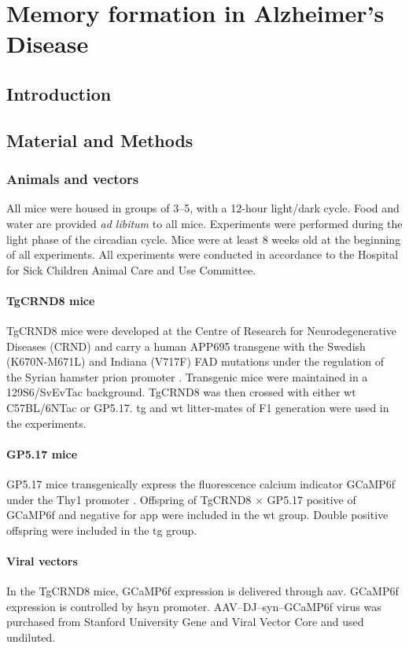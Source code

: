 \chapter{Memory formation in Alzheimer's Disease}
\section{Introduction}

\section{Material and Methods}

\subsection{Animals and vectors}
All mice were housed in groups of 3--5, with a 12-hour light/dark cycle. Food and water are provided \textit{ad libitum} to all mice. Experiments were performed during the light phase of the circadian cycle. Mice were at least 8 weeks old at the beginning of all experiments. All experiments were conducted in accordance to the Hospital for Sick Children Animal Care and Use Committee.

\subsubsection{TgCRND8 mice}
TgCRND8 mice were developed at the Centre of Research for Neurodegenerative Diseases (CRND) and carry a human APP695 transgene with the Swedish (K670N-M671L) and Indiana (V717F) FAD mutations under the regulation of the Syrian hamster prion promoter \citep{chishti01}. Transgenic mice were maintained in a 129S6/SvEvTac background. TgCRND8 was then crossed with either \gls{wt} C57BL/6NTac or GP5.17. \Gls{tg} and \gls{wt} litter-mates of F1 generation were used in the experiments.


\subsubsection{GP5.17 mice}
GP5.17 mice transgenically express the fluorescence calcium indicator GCaMP6f under the Thy1 promoter \citep{dana14}. Offspring of TgCRND8 $\times$ GP5.17 positive of GCaMP6f and negative for \gls{app} were included in the \gls{wt} group. Double positive offspring were included in the \gls{tg} group.


\subsubsection{Viral vectors}
In the TgCRND8 mice, GCaMP6f expression is delivered through \gls{aav}. GCaMP6f expression is controlled by \gls{hsyn} promoter. AAV--DJ--syn--GCaMP6f virus was purchased from Stanford University Gene and Viral Vector Core and used undiluted. 

